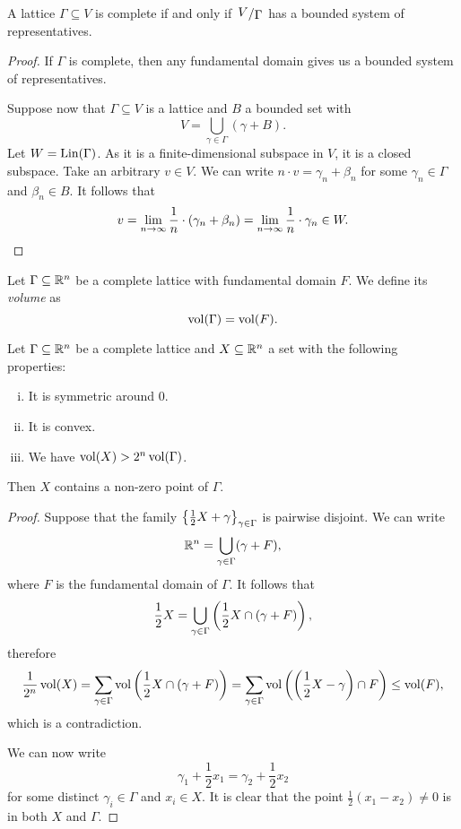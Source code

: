 \begin{lema}
A lattice $\Gamma \subseteq V$ is complete if and only if
$\kvoc{V}{\Gamma}$ has a bounded system of representatives.
\end{lema}

\begin{proof}
If $\Gamma$ is complete, then any fundamental domain gives us a
bounded system of representatives.

Suppose now that $\Gamma \subseteq V$ is a lattice and $B$ a
bounded set with
\[
V = \bigcup_{\gamma \in \Gamma} (\gamma + B).
\]
Let $W = \operatorname{Lin}(\Gamma)$. As it is a finite-dimensional subspace in
$V$, it is a closed subspace. Take an arbitrary $v \in V$. We can
write $n \cdot v = \gamma_n + \beta_n$ for some
$\gamma_n \in \Gamma$ and $\beta_n \in B$. It follows that
\[
v =
\lim_{n \to \infty} \frac{1}{n} \cdot \left(\gamma_n + \beta_n\right) =
\lim_{n \to \infty} \frac{1}{n} \cdot \gamma_n \in W. \qedhere
\]
\end{proof}


\begin{definicija}
Let $\Gamma \subseteq \mathbb{R}^n$ be a complete lattice with fundamental
domain $F$. We define its \emph{volume} as
\[
\operatorname{vol}(\Gamma) = \operatorname{vol}(F).
\]
\end{definicija}

\begin{izrek}[Minkowski]
Let $\Gamma \subseteq \mathbb{R}^n$ be a complete lattice and
$X \subseteq \mathbb{R}^n$ a set with the following properties:

\begin{enumerate}[i)]
\item It is symmetric around $0$.
\item It is convex.
\item We have $\operatorname{vol}(X) > 2^n \operatorname{vol}(\Gamma)$.
\end{enumerate}

Then $X$ contains a non-zero point of $\Gamma$.
\end{izrek}

\begin{proof}
Suppose that the family
$\left\{\frac{1}{2} X + \gamma\right\}_{\gamma \in \Gamma}$ is pairwise
disjoint. We can write
\[
\mathbb{R}^n = \bigcup_{\gamma \in \Gamma} (\gamma + F),
\]
where $F$ is the fundamental domain of $\Gamma$. It follows that
\[
\frac{1}{2} X =
\bigcup_{\gamma \in \Gamma} \left(\frac{1}{2} X \cap (\gamma + F)\right),
\]
therefore
\[
\frac{1}{2^n} \operatorname{vol}(X) =
\sum_{\gamma \in \Gamma}
\operatorname{vol} \left(\frac{1}{2} X \cap (\gamma + F)\right) =
\sum_{\gamma \in \Gamma}
\operatorname{vol} \left(\left(\frac{1}{2} X - \gamma\right) \cap F\right) \leq
\operatorname{vol}(F),
\]
which is a contradiction.

We can now write
\[
\gamma_1 + \frac{1}{2} x_1 = \gamma_2 + \frac{1}{2} x_2
\]
for some distinct $\gamma_i \in \Gamma$ and $x_i \in X$. It is
clear that the point $\frac{1}{2} (x_1 - x_2) \ne 0$ is in both $X$
and $\Gamma$.
\end{proof}

